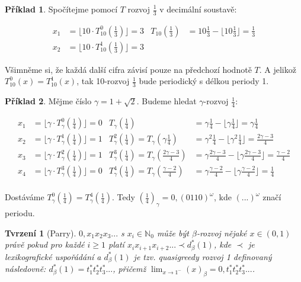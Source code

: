 \documentclass{article}
\newtheorem{theorem}{Tvrzení}
\theoremstyle{definition}
\newtheorem{example}{Příklad}
\theoremstyle{definition}
\theoremstyle{remark}
\numberwithin{equation}{section}
\begin{document}
\begin{example}
	Spočítejme pomocí $T$ rozvoj $\frac{1}{3}$ v decimální soustavě:

	\begin{align*}
		x_1 & = \lfloor 10 \cdot T_{10}^0(\frac{1}{3}) \rfloor = 3 & T_{10}(\frac{1}{3}) & = 10 \frac{1}{3} - \lfloor 10 \frac{1}{3} \rfloor = \frac{1}{3} \\
		x_2 & = \lfloor 10 \cdot T_{10}^1(\frac{1}{3}) \rfloor = 3
	\end{align*}

	Všimněme si, že každá další cifra závisí pouze na předchozí hodnotě $T$. A jelikož $T_{10}^0(x) = T_{10}^1(x)$, tak 10-rozvoj $\frac{1}{3}$ bude periodický s délkou periody 1.
\end{example}

\begin{example}
	Mějme číslo $\gamma = 1 + \sqrt{2}$. Budeme hledat $\gamma$-rozvoj $\frac{1}{4}$:

	\begin{align*}
		x_1 & = \lfloor \gamma \cdot T_{\gamma}^0(\frac{1}{4}) \rfloor = 0 & T_\gamma(\frac{1}{4})                                     & = \gamma \frac{1}{4} - \lfloor \gamma \frac{1}{4} \rfloor = \gamma \frac{1}{4}                     \\
		x_2 & = \lfloor \gamma \cdot T_{\gamma}^1(\frac{1}{4}) \rfloor = 1 & T_\gamma^2(\frac{1}{4}) = T_\gamma(\gamma\frac{1}{4})     & = \gamma^2 \frac{1}{4} - \lfloor \gamma^2 \frac{1}{4} \rfloor = \frac{2\gamma - 3}{4}              \\
		x_3 & = \lfloor \gamma \cdot T_{\gamma}^2(\frac{1}{4}) \rfloor = 1 & T_\gamma^3(\frac{1}{4}) = T_\gamma(\frac{2\gamma - 3}{4}) & = \gamma\frac{2\gamma - 3}{4} - \lfloor \gamma\frac{2\gamma - 3}{4} \rfloor = \frac{\gamma - 2}{4} \\
		x_4 & = \lfloor \gamma \cdot T_{\gamma}^3(\frac{1}{4}) \rfloor = 0 & T_\gamma^4(\frac{1}{4}) = T_\gamma(\frac{\gamma - 2}{4})  & = \gamma\frac{\gamma - 2}{4} - \lfloor \gamma\frac{\gamma - 2}{4} \rfloor = \frac{1}{4}            \\
	\end{align*}

	Dostáváme $T_\gamma^0(\frac{1}{4}) = T_\gamma^4(\frac{1}{4})$. Tedy $(\frac{1}{4})_\gamma = 0,(0110)^\omega$, kde $(...)^\omega$ značí periodu.
\end{example}

\begin{theorem}[Parry] \label{Parry}
	$0,x_1x_2x_3...$ s $x_i \in \mathbb{N}_0$ může být $\beta$-rozvoj nějaké $x \in (0, 1)$ právě pokud pro každé $i \geq 1$ platí $x_ix_{i + 1}x_{i + 2}... \prec d^\ast_\beta(1)$, kde $\prec$ je lexikografické uspořádání a $d^\ast_\beta(1)$ je tzv. \textit{quasigreedy} rozvoj 1 definovaný následovně: $d^\ast_\beta(1) = t^\ast_1 t^\ast_2 t^\ast_3...$, přičemž $\lim_{x \to 1^-}(x)_\beta = 0,t^\ast_1 t^\ast_2 t^\ast_3...$.
\end{theorem}
\end{document}

